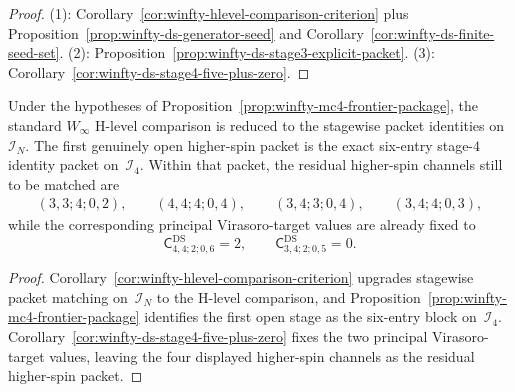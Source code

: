 \begin{proof}
\textup{(1)}: Corollary~\ref{cor:winfty-hlevel-comparison-criterion} plus Proposition~\ref{prop:winfty-ds-generator-seed} and Corollary~\ref{cor:winfty-ds-finite-seed-set}. \textup{(2)}: Proposition~\ref{prop:winfty-ds-stage3-explicit-packet}. \textup{(3)}: Corollary~\ref{cor:winfty-ds-stage4-five-plus-zero}.
\end{proof}

\begin{corollary}
\label{cor:winfty-stage4-closure-criterion}
Under the hypotheses of
Proposition~\ref{prop:winfty-mc4-frontier-package}, the standard
\texorpdfstring{$W_\infty$}{W_infty} H-level comparison is reduced to
the stagewise packet identities on~$\mathcal{I}_N$. The first
genuinely open higher-spin packet is the exact six-entry stage-$4$
identity packet on~$\mathcal{I}_4$. Within that packet, the residual
higher-spin channels still to be matched are
\[
\begin{gathered}
(3,3;4;0,2),\qquad
(4,4;4;0,4),\qquad
(3,4;3;0,4),\qquad
(3,4;4;0,3),
\end{gathered}
\]
while the corresponding principal Virasoro-target values are already
fixed to
\[
\mathsf{C}^{\mathrm{DS}}_{4,4;2;0,6}=2,
\qquad
\mathsf{C}^{\mathrm{DS}}_{3,4;2;0,5}=0.
\]
\end{corollary}

\begin{proof}
Corollary~\ref{cor:winfty-hlevel-comparison-criterion} upgrades
stagewise packet matching on~$\mathcal{I}_N$ to the H-level
comparison, and
Proposition~\ref{prop:winfty-mc4-frontier-package} identifies the first
open stage as the six-entry block on~$\mathcal{I}_4$.
Corollary~\ref{cor:winfty-ds-stage4-five-plus-zero} fixes the two
principal Virasoro-target values, leaving the four displayed
higher-spin channels as the residual higher-spin packet.
\end{proof}

